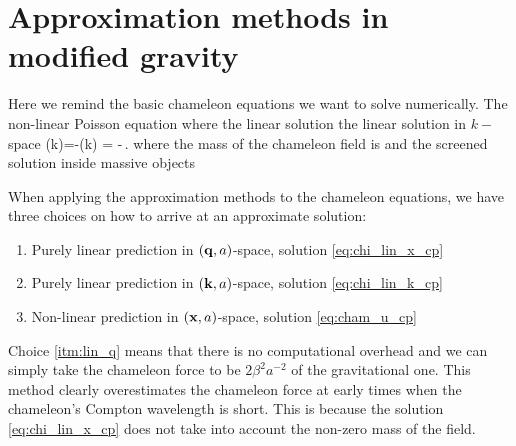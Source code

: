 \section{Approximation methods in modified gravity}
Here we remind the basic chameleon equations we want to solve numerically. The non-linear Poisson equation
where
the linear solution
the linear solution in $k-$space
\eq
{
\label{eq:chi_lin_k_cp}
	\hat{\chi}(k)=-\hat{\delta}(k) = -\,.
}
where the mass of the chameleon field is
and the screened solution inside massive objects

When applying the approximation methods to the chameleon equations, we have three choices on how to arrive at an approximate solution:
\begin{enumerate}
\item \label{itm:lin_q} Purely linear prediction in $(\mathbf q, a)$-space, solution \eqref{eq:chi_lin_x_cp}

\item \label{itm:lin_k} Purely linear prediction in $(\mathbf k, a)$-space, solution \eqref{eq:chi_lin_k_cp}

\item \label{itm:nl_x} Non-linear prediction in $(\mathbf x, a)$-space, solution \eqref{eq:cham_u_cp}
\end{enumerate}

Choice \ref{itm:lin_q} means that there is no computational overhead and we can simply take the chameleon force to be $2\beta^2a^{-2}$ of the gravitational one. This method clearly overestimates the chameleon force at early times when the chameleon's Compton wavelength is short. This is because the solution \eqref{eq:chi_lin_x_cp} does not take into account the non-zero mass of the field.

